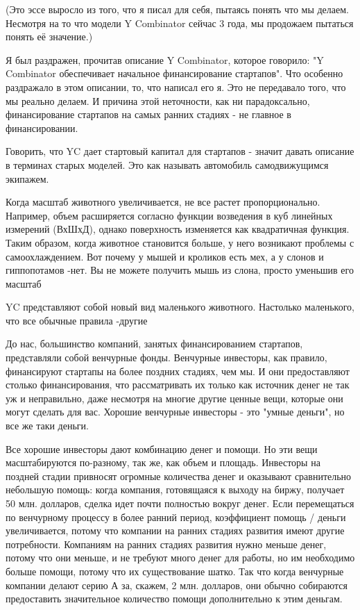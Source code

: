 \documentclass[ebook,12pt,oneside,openany]{memoir}
\author{Пол Грэм} \date{}
\begin{document}
\maketitle

(Это эссе выросло из того, что я писал для себя, пытаясь понять что мы
делаем. Несмотря на то что модели Y Combinator сейчас 3 года, мы
продожаем пытаться понять её значение.)

Я был раздражен, прочитав описание Y Combinator, которое говорило: "Y
Combinator обеспечивает начальное финансирование стартапов". Что
особенно раздражало в этом описании, то, что написал его я. Это не
передавало того, что мы реально делаем. И причина этой неточности, как
ни парадоксально, финансирование стартапов на самых ранних стадиях -
не главное в финансировании.

Говорить, что YC дает стартовый капитал для стартапов - значит давать
описание в терминах старых моделей. Это как называть автомобиль
самодвижущимся экипажем.

Когда масштаб животного увеличивается, не все растет пропорционально.
Например, объем расширяется согласно функции возведения в куб линейных
измерений (ВхШхД), однако поверхность изменяется как квадратичная
функция. Таким образом, когда животное становится больше, у него
возникают проблемы с самоохлаждением. Вот почему у мышей и кроликов
есть мех, а у слонов и гиппопотамов -нет. Вы не можете получить мышь
из слона, просто уменьшив его масштаб

YC представляют собой новый вид маленького животного. Настолько
маленького, что все обычные правила -другие

До нас, большинство компаний, занятых финансированием стартапов,
представляли собой венчурные фонды. Венчурные инвесторы, как правило,
финансируют стартапы на более поздних стадиях, чем мы. И они
предоставляют столько финансирования, что рассматривать их только как
источник денег не так уж и неправильно, даже несмотря на многие другие
ценные вещи, которые они могут сделать для вас. Хорошие венчурные
инвесторы - это "умные деньги", но все же таки деньги.

Все хорошие инвесторы дают комбинацию денег и помощи. Но эти вещи
масштабируются по-разному, так же, как объем и площадь. Инвесторы на
поздней стадии привносят огромные количества денег и оказывают
сравнительно небольшую помощь: когда компания, готовящаяся к выходу на
биржу, получает 50 млн. долларов, сделка идет почти полностью вокруг
денег. Если перемещаться по венчурному процессу в более ранний период,
коэффициент помощь / деньги увеличивается, потому что компании на
ранних стадиях развития имеют другие потребности. Компаниям на ранних
стадиях развития нужно меньше денег, потому что они меньше, и не
требуют много денег для работы, но им необходимо больше помощи, потому
что их существование шатко. Так что когда венчурные компании делают
серию А за, скажем, 2 млн. долларов, они обычно собираются
предоставить значительное количество помощи дополнительно к этим
деньгам.
\end{document}
